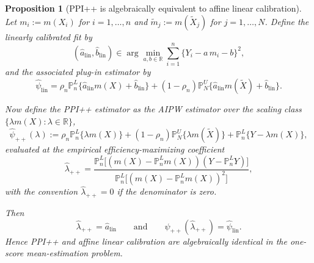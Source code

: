 \documentclass{article}
\theoremstyle{plain}
\newtheorem{proposition}{Proposition}
\theoremstyle{definition}
\newcommand{\R}{\mathbb{R}}
\newcommand{\1}{\mathbbm{1}}
\newcommand{\Pl}{\mathbb{P}^{L}_n}
\newcommand{\Pu}{\mathbb{P}^{U}_N}
\begin{document}
\begin{proposition}[PPI++ is algebraically equivalent to affine linear calibration]
\label{prop:ppi++-linear}
Let \(m_i:=m(X_i)\) for \(i=1,\dots,n\) and \(\tilde m_j:=m(\widetilde X_j)\) for \(j=1,\dots,N\). Define the linearly calibrated fit by
\[
(\hat a_{\mathrm{lin}},\hat b_{\mathrm{lin}})
\in
\arg\min_{a,b\in\R}\sum_{i=1}^n \{Y_i-a\,m_i-b\}^2,
\]
and the associated plug-in estimator by
\[
\widehat\psi_{\mathrm{lin}}
=
\rho_n \Pl\{\hat a_{\mathrm{lin}} m(X)+\hat b_{\mathrm{lin}}\}
+
(1-\rho_n)\Pu\{\hat a_{\mathrm{lin}} m(\widetilde X)+\hat b_{\mathrm{lin}}\}.
\]

Now define the PPI++ estimator as the AIPW estimator over the scaling class
\(\{\lambda m(X):\lambda\in\R\}\),
\[
\widehat\psi_{++}(\lambda)
:=
\rho_n \Pl\{\lambda m(X)\}
+
(1-\rho_n)\Pu\{\lambda m(\widetilde X)\}
+
\Pl\{Y-\lambda m(X)\},
\]
evaluated at the empirical efficiency-maximizing coefficient \citep{rubin2008empirical,angelopoulos2023ppi}
\[
\hat\lambda_{++}
=
\frac{\Pl\!\bigl[(m(X)-\Pl m(X))(Y-\Pl Y)\bigr]}
{\Pl\!\bigl[(m(X)-\Pl m(X))^2\bigr]},
\]
with the convention \(\hat\lambda_{++}=0\) if the denominator is zero.

Then
\[
\hat\lambda_{++}=\hat a_{\mathrm{lin}}
\qquad\text{and}\qquad
\widehat\psi_{++}(\hat\lambda_{++})=\widehat\psi_{\mathrm{lin}}.
\]
Hence PPI++ and affine linear calibration are algebraically identical in the one-score mean-estimation problem.
\end{proposition}
\end{document}
